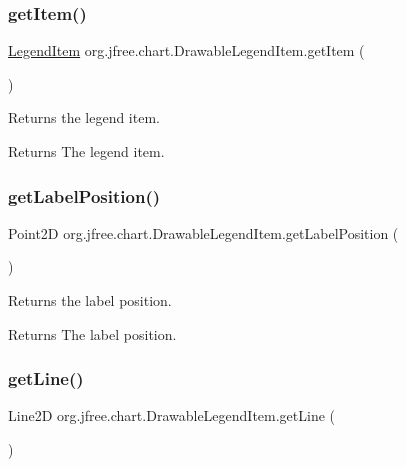 \subsubsection{\texorpdfstring{get\+Item()}{getItem()}}
{\footnotesize\ttfamily \mbox{\hyperlink{classorg_1_1jfree_1_1chart_1_1_legend_item}{Legend\+Item}} org.\+jfree.\+chart.\+Drawable\+Legend\+Item.\+get\+Item (\begin{DoxyParamCaption}{ }\end{DoxyParamCaption})}

Returns the legend item.

\begin{DoxyReturn}{Returns}
The legend item. 
\end{DoxyReturn}
\mbox{\label{classorg_1_1jfree_1_1chart_1_1_drawable_legend_item_a2ded171381be78d231cb0d7d64f9e544}} 
\subsubsection{\texorpdfstring{get\+Label\+Position()}{getLabelPosition()}}
{\footnotesize\ttfamily Point2D org.\+jfree.\+chart.\+Drawable\+Legend\+Item.\+get\+Label\+Position (\begin{DoxyParamCaption}{ }\end{DoxyParamCaption})}

Returns the label position.

\begin{DoxyReturn}{Returns}
The label position. 
\end{DoxyReturn}
\mbox{\label{classorg_1_1jfree_1_1chart_1_1_drawable_legend_item_afb3b383ce596cfe2861564b90d5443eb}} 
\subsubsection{\texorpdfstring{get\+Line()}{getLine()}}
{\footnotesize\ttfamily Line2D org.\+jfree.\+chart.\+Drawable\+Legend\+Item.\+get\+Line (\begin{DoxyParamCaption}{ }\end{DoxyParamCaption})}

